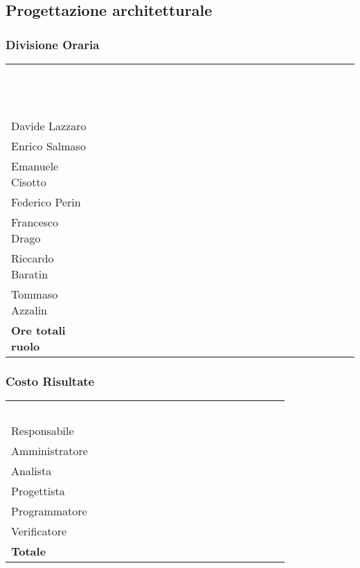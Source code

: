 \subsection{Progettazione architetturale}

\subsubsection{Divisione Oraria}
{
	\renewcommand{\arraystretch}{2}
	\centering
	\begin{longtable}{ C{5cm} C{1cm} C{1cm} C{1cm} C{1cm} C{1cm} C{1cm} C{3cm}}
		\textcolor{white}{\textbf{Nome membro del gruppo}} & \textcolor{white}{\textbf{RE}} & \textcolor{white}{\textbf{AM}} & \textcolor{white}{\textbf{AN}} & \textcolor{white}{\textbf{PT}} & \textcolor{white}{\textbf{PR}} & \textcolor{white}{\textbf{VE}} & \textcolor{white}{\textbf{Ore complessive}}\\	
        
        Davide Lazzaro & & & & & & & \\
        Enrico Salmaso & & & & & & & \\
        Emanuele Cisotto & & & & & & & \\
        Federico Perin & & & & & & & \\
        Francesco Drago & & & & & & & \\
        Riccardo Baratin & & & & & & & \\
        Tommaso Azzalin & & & & & & & \\
        \textbf{Ore totali ruolo} & & & & & & & \\
		
	\end{longtable}
}

\subsubsection{Costo Risultate}
{
	\renewcommand{\arraystretch}{2}
	\centering
	\begin{longtable}{ C{3cm} C{2cm} C{4cm}}
		\textcolor{white}{\textbf{Ruolo}} & \textcolor{white}{\textbf{Totale ore}} & \textcolor{white}{\textbf{Costo Ruolo in euro}}\\	
        
        Responsabile & & \\
        Amministratore & & \\
        Analista & & \\
        Progettista & & \\
        Programmatore & & \\
        Verificatore & & \\
        \textbf{Totale} & & \\
		
	\end{longtable}
}

